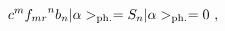 \begin{equation}
 c^{m} {f_{mr}}^n b_n  | \alpha >_{{\rm ph.}} = S_n  | \alpha >_{{\rm ph.}} =0~, \label{eq:belliiki}      
\end{equation}


